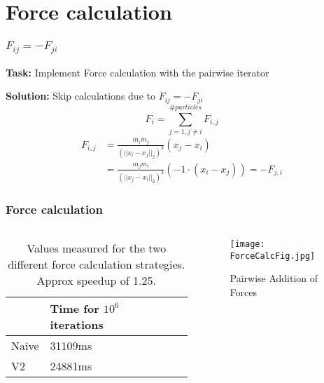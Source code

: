 \section{Force calculation}

\begin{frame}
    \frametitle{$F_{ij} = -F_{ji}$}
        \textbf{Task:} Implement Force calculation with the pairwise iterator

        \textbf{Solution:} Skip calculations due to $F_{ij} = -F_{ji}$
        \vspace{-15pt}
        \begin{equation}
            F_i = \sum_{j=1, j \neq i}^{\#particles} F_{i,j}
        \end{equation}
        \vspace{-15pt}
        \begin{align}
            F_{i,j} &= \frac{m_im_j}{(||x_i-x_j||_2)^3} (x_j - x_i) \\
                    &= \frac{m_jm_i}{(||x_j-x_i||_2)^3} \left(-1 \cdot \left(x_i - x_j\right)\right) = - F_{j,i}
        \end{align}
\end{frame}

\begin{frame}
    \frametitle{Force calculation}
    \begin{columns}
        \begin{column}{0.5\textwidth}
            \begin{table}[H]
                \begin{tabular}{|l|l|l|l|l|}
                \hline
                    & Time for $10^6$ iterations \\ \hline
                Naive & 31109ms                  \\ \hline
                V2    & 24881ms                  \\ \hline
                \end{tabular}
                \caption{Values measured for the two different force calculation strategies. Approx speedup of 1.25.}
                \label{tab:speedup}
            \end{table}
        \end{column}
        \begin{column}{0.5\textwidth}
            \begin{figure}[]
                \centering
                \texttt{[image: ForceCalcFig.jpg]}
                \caption{Pairwise Addition of Forces}
            \end{figure}
        \end{column}
    \end{columns}
\end{frame}